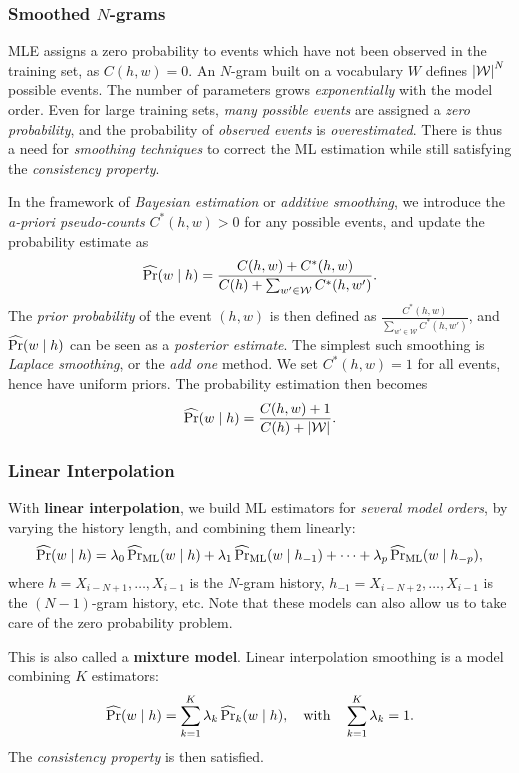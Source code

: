 \subsubsection{Smoothed \(N\)-grams}
MLE assigns a zero probability to events which have not been observed in the training set, as \(C(h, w) = 0\).
An \(N\)-gram built on a vocabulary \(W\) defines \({\left\lvert\mathcal{W}\right\lvert}^N\) possible events.
The number of parameters grows \emph{exponentially} with the model order.
Even for large training sets, \emph{many possible events} are assigned a \emph{zero probability}, and the probability of \emph{observed events} is \emph{overestimated}.
There is thus a need for \emph{smoothing techniques} to correct the ML estimation while still satisfying the \emph{consistency property}.

In the framework of \emph{Bayesian estimation} or \emph{additive smoothing}, we introduce the \emph{a-priori pseudo-counts} \(C^*(h, w) > 0\) for any possible events, and update the probability estimate as
\[
\operatorname{\widehat{\Pr}}(w \mid h) = \frac{C(h, w) + C^*(h, w)}{C(h) + \sum_{w' \in \mathcal{W}} C^*(h, w')}.
\]
The \emph{prior probability} of the event \((h, w)\) is then defined as \(\frac{C^*(h, w)}{\sum_{w' \in \mathcal{W}} C^*(h, w')}\), and \(\operatorname{\widehat{\Pr}}(w \mid h)\) can be seen as a \emph{posterior estimate}.
The simplest such smoothing is \emph{Laplace smoothing}, or the \emph{add one} method.
We set \(C^*(h, w) = 1\) for all events, hence have uniform priors.
The probability estimation then becomes
\[
\operatorname{\widehat{\Pr}}(w \mid h) = \frac{C(h, w) + 1}{C(h) + {\left\lvert\mathcal{W}\right\lvert}}.
\]

\subsubsection{Linear Interpolation}
With \textbf{linear interpolation}, we build ML estimators for \emph{several model orders}, by varying the history length, and combining them linearly:
\[
\operatorname{\widehat{\Pr}}(w \mid h) = \lambda_0 \operatorname{\widehat{\Pr}}_\textnormal{ML}(w \mid h) + \lambda_1 \operatorname{\widehat{\Pr}}_\textnormal{ML}(w \mid h_{-1}) + \dots + \lambda_p \operatorname{\widehat{\Pr}}_\textnormal{ML}(w \mid h_{-p}),
\]
where \(h = X_{i - N + 1}, \dots, X_{i-1}\) is the \(N\)-gram history, \(h_{-1} = X_{i - N + 2}, \dots, X_{i-1}\) is the \((N-1)\)-gram history, etc.
Note that these models can also allow us to take care of the zero probability problem.

This is also called a \textbf{mixture model}.
Linear interpolation smoothing is a model combining \(K\) estimators:
\[
\operatorname{\widehat{\Pr}}(w \mid h) = \sum_{k = 1}^K \lambda _k \operatorname{\widehat{\Pr}}_k(w \mid h), \quad \textnormal{with} \quad \sum_{k = 1}^K \lambda_k = 1.
\]
The \emph{consistency property} is then satisfied.

